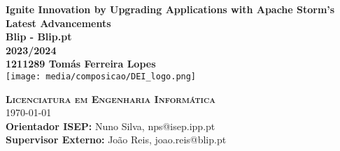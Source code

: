 \begin{center}

    \center

    {\huge \bfseries Ignite Innovation by Upgrading Applications with Apache Storm's Latest Advancements}\\[.5cm]

    {\bfseries Blip - Blip.pt }\\[1cm]

    {\Large \bfseries 2023/2024}\\[2cm]

    {\Large\bf 1211289 Tomás Ferreira Lopes }\\[2.5cm]


    \texttt{[image: media/composicao/DEI\_logo.png]}

    \vfill

    \textsc{
        \Large \bfseries Licenciatura em Engenharia Informática
    }
    \HRuleFront
    \\[.5cm]

    {\Large \monthyeardate\today}\\[1cm]

    {{\small\bf Orientador ISEP:  } {\small Nuno Silva, nps@isep.ipp.pt}} \\[4pt]
    {{\small\bf Supervisor Externo:} {\small João Reis, joao.reis@blip.pt}} \\[4pt]

\end{center}
